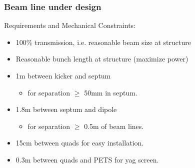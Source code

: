 \documentclass[professionalfonts,t]{beamer}
\begin{document}
\begin{frame}
\frametitle{Beam line under design}
\begin{tikzpicture}[scale=\textwidth/22cm, text=black]

\end{tikzpicture}

\vspace{-1.5em}
Requirements and Mechanical Constraints:
\begin{itemize}
	\item 100\% transmission, i.e. reasonable beam size at structure
	\item Reasonable bunch length at structure (maximize power)
	\item 1m between kicker and septum
	\begin{itemize}
		\item for separation $\ge$ 50mm in septum. 
	\end{itemize}
	\item 1.8m between septum and dipole
	\begin{itemize}
		\item for separation $\ge$ 0.5m of beam lines.
	\end{itemize}
	\item 15cm between quads for easy installation. 
	\item 0.3m between quads and PETS for yag screen.  
\end{itemize}
\end{frame}
\end{document}
